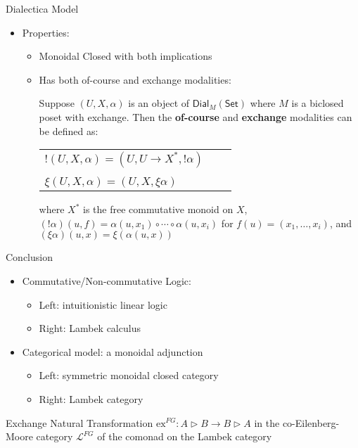 \documentclass{beamer}
\newcommand{\Set}{\mathsf{Set}}
\newcommand{\Dial}[2]{\mathsf{Dial}_{#1}(#2)}
\begin{document}
\begin{frame}{Dialectica Model}
  \begin{itemize}
  \item[] Properties:
    \begin{itemize}
    \item Monoidal Closed with both implications
    \item Has both of-course and exchange modalities:
      \begin{definition}
        \label{def:modalities-dial}
        Suppose $(U, X, \alpha)$ is an object of $\Dial{M}{\Set}$ where $M$
        is a biclosed poset with exchange. Then the \textbf{of-course} and
        \textbf{exchange} modalities can be defined as:
        \begin{center}
            \begin{tabular}{lll}
              $! (U, X, \alpha) = (U, U \rightarrow X^*, !\alpha)$\\
              \\
              $\xi (U, X, \alpha) = (U, X, \xi \alpha)$              
            \end{tabular}
        \end{center}
        where $X^*$ is the free commutative monoid on $X$, $(!\alpha)(u, f)
              = \alpha(u, x_1) \circ \cdots \circ \alpha(u, x_i)$ for $f(u) =
              (x_1, \ldots, x_i)$, and $(\xi \alpha)(u, x) = \xi (\alpha(u,
              x))$
      \end{definition}
    \end{itemize}
  \end{itemize}
\end{frame}

\begin{frame}{Conclusion}

\begin{itemize}
\item Commutative/Non-commutative Logic:
      \begin{itemize}
      \item Left: intuitionistic linear logic
      \item Right: Lambek calculus
      \end{itemize}
\item Categorical model: a monoidal adjunction
      \begin{itemize}
      \item Left: symmetric monoidal closed category
      \item Right: Lambek category
      \end{itemize}
\end{itemize}

\begin{block}{Exchange Natural Transformation}
$\mathrm{ex}^{FG}:A\triangleright B\rightarrow B\triangleright A$ in the
co-Eilenberg-Moore category $\mathcal{L}^{FG}$ of the comonad on the Lambek
category
\end{block}

\end{frame}
\end{document}
